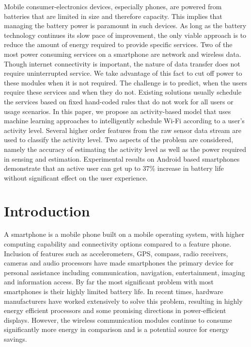 Mobile consumer-electronics devices, especially phones, are powered from batteries that are limited in size and therefore capacity. This implies that managing the battery power is paramount in such devices. As long as the battery technology continues its slow pace of improvement, the only viable approach is to reduce the amount of energy required to provide specific services. Two of the most power consuming services on a smartphone are network and wireless data. Though internet connectivity is important, the nature of data transfer does not require uninterrupted service. We take advantage of this fact to cut off power to these modules when it is not required. The challenge is to predict, when the users require these services and when they do not. Existing solutions usually schedule the services based on fixed hand-coded rules that do not work for all users or usage scenarios.  In this paper, we propose an activity-based model that uses machine learning approaches to intelligently schedule Wi-Fi according to a user's activity level. Several higher order features from the raw sensor data stream are used to classify the activity level. Two aspects of the problem are considered, namely the accuracy of estimating the activity level as well as the power required in sensing and estimation. Experimental results on Android based smartphones demonstrate that an active user can get up to 37\% increase in battery life without significant effect on the user experience.

\section{Introduction}
A smartphone is a mobile phone built on a mobile operating system, with higher computing capability
and connectivity options compared to a feature phone. Inclusion of features such as accelerometers,
GPS, compass, radio receivers, cameras and audio processors have made smartphones the primary
device for personal assistance including communication, navigation, entertainment, imaging and
information access. By far the most significant
problem with most smartphones is their highly limited battery life. In recent times, hardware
manufacturers have worked extensively to solve this problem, resulting in highly energy efficient
processors and some promising directions in power-efficient displays. However, the wireless communication modules continue to consume significantly more energy in comparison and is a potential  source for energy savings.


